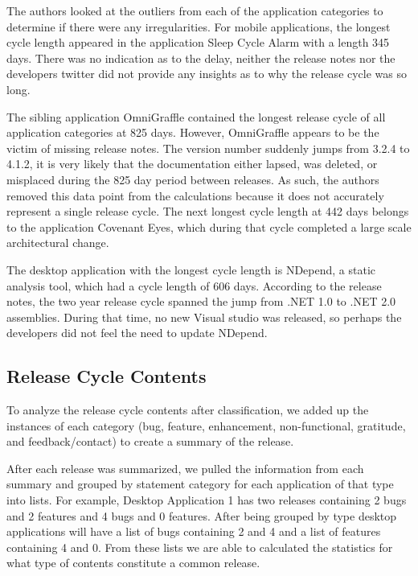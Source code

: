 \documentclass{acm_proc_article-sp}
\begin{document}
 The authors looked at the outliers from each of the application categories to determine if there were any irregularities.
For mobile applications, the longest cycle length appeared in the application Sleep Cycle Alarm with a length 345 days. 
There was no indication as to the delay, neither the release notes nor the developers twitter did not provide any insights as to why the release cycle was so long.

The sibling application OmniGraffle contained the longest release cycle of all application categories at 825 days. 
However, OmniGraffle appears to be the victim of missing release notes.
The version number suddenly jumps from 3.2.4 to 4.1.2, it is very likely that the documentation either lapsed, was deleted, or misplaced during the 825 day period between releases.
As such, the authors removed this data point from the calculations because it does not accurately represent a single release cycle. 
The next longest cycle length at 442 days belongs to the application Covenant Eyes, which during that cycle completed a large scale architectural change.

The desktop application with the longest cycle length is NDepend, a static analysis tool, which had a cycle length of 606 days. 
According to the release notes, the two year release cycle spanned the jump from .NET 1.0 to .NET 2.0 assemblies.
During that time, no new Visual studio was released, so perhaps the developers did not feel the need to update NDepend.


\subsection{Release Cycle Contents}

To analyze the release cycle contents after classification, we added up the instances of each category (bug, feature, enhancement, non-functional, gratitude, and feedback/contact) to create a summary of the release.

After each release was summarized, we pulled the information from each summary and grouped by statement category for each application of that type into lists. 
For example, Desktop Application 1 has two releases containing 2 bugs and 2 features and 4 bugs and 0 features. After being grouped by type desktop applications will have a list of bugs containing 2 and 4 and a list of features containing 4 and 0.
From these lists we are able to calculated the statistics for what type of contents constitute a common release.
\end{document}
